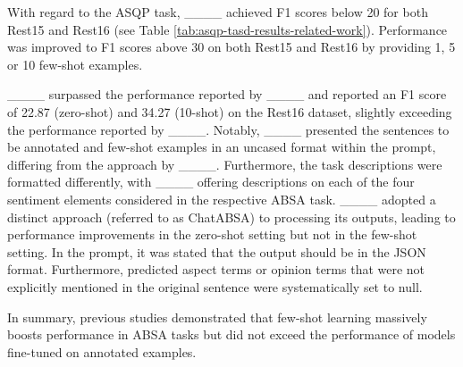 With regard to the ASQP task, ____ achieved F1 scores below 20 for both Rest15 and Rest16 (see Table \ref{tab:asqp-tasd-results-related-work}). Performance was improved to F1 scores above 30 on both Rest15 and Rest16 by providing 1, 5 or 10 few-shot examples.

____ surpassed the performance reported by ____ and reported an F1 score of 22.87 (zero-shot) and 34.27 (10-shot) on the Rest16 dataset, slightly exceeding the performance reported by ____. Notably, ____ presented the sentences to be annotated and few-shot examples in an uncased format within the prompt, differing from the approach by ____. Furthermore, the task descriptions were formatted differently, with ____ offering descriptions on each of the four sentiment elements considered in the respective ABSA task. ____ adopted a distinct approach (referred to as ChatABSA) to processing its outputs, leading to performance improvements in the zero-shot setting but not in the few-shot setting. In the prompt, it was stated that the output should be in the JSON format. Furthermore, predicted aspect terms or opinion terms that were not explicitly mentioned in the original sentence were systematically set to null.

In summary, previous studies demonstrated that few-shot learning massively boosts performance in ABSA tasks but did not exceed the performance of models fine-tuned on annotated examples.